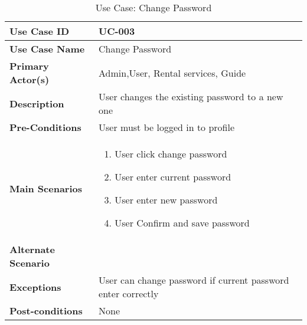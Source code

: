 \begin{table}[ht]
    \centering
    \begin{tabular}{|l|p{}|}
        \hline
        \textbf{Use Case ID} & UC-003 \\
        \hline
        \textbf{Use Case Name} & Change Password \\
        \hline
        \textbf{Primary Actor(s)} & Admin,User, Rental services, Guide \\
        \hline
        \textbf{Description} & User changes the existing password to a new one \\
        \hline
        \textbf{Pre-Conditions} & User must be logged in to profile \\
        \hline
        \textbf{Main Scenarios} & 
        \begin{enumerate}[label=\arabic*.,itemsep=0pt]
            \item User click change password
            \item User enter current password
            \item User enter new password
            \item User Confirm and save password
        \end{enumerate} \\
        \hline
        \textbf{Alternate Scenario} & 
 \\
        \hline
        \textbf{Exceptions} & User can change password if current password enter correctly \\
        \hline
        \textbf{Post-conditions} & None \\
        \hline
    \end{tabular}
    \label{tab:use-case-login}
    \caption{Use Case: Change Password}
\end{table}



